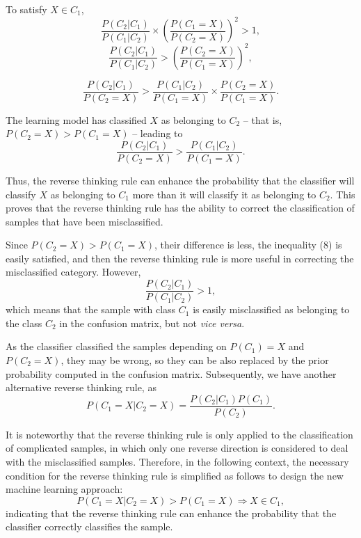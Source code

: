 To satisfy $X\in C_1$,
\begin{displaymath}
   \frac{P(C_2|C_1)}{P(C_1|C_2)}\times (\frac{P(C_1=X)}{P(C_2=X)})^2 >1,
\end{displaymath}
\begin{equation}
   \frac{P(C_2|C_1)}{P(C_1|C_2)} > (\frac{P(C_2=X)}{P(C_1=X)})^2,
\end{equation}

\begin{displaymath}
   \frac{P(C_2|C_1)}{P(C_2=X)} > \frac{P(C_1|C_2)}{P(C_1=X)}\times \frac{P(C_2=X)}{P(C_1=X)}.
\end{displaymath}

The learning model has classified $X$ as belonging to $C_2$ -- that is, $P(C_2=X)>P(C_1=X)$ -- leading to
\begin{displaymath}
   \frac{P(C_2|C_1)}{P(C_2=X)} > \frac{P(C_1|C_2)}{P(C_1=X)}.
\end{displaymath}

Thus, the reverse thinking rule can enhance the probability that the classifier will classify $X$ as belonging to $C_1$ more than it will classify it as belonging to $C_2$. This proves that the reverse thinking rule has the ability to correct the classification of samples that have been misclassified.


Since $P(C_2=X)>P(C_1=X)$, their difference is less, the inequality (8) is easily satisfied, and then the reverse thinking rule is more useful in correcting the misclassified category. However,
\begin{displaymath}
   \frac{P(C_2|C_1)}{P(C_1|C_2)} > 1,
\end{displaymath}
which means that the sample with class $C_1$ is easily misclassified as belonging to the class $C_2$ in the confusion matrix, but not \textit{vice versa}.

As the classifier classified the samples depending on $P(C_1)=X$ and $P(C_2=X)$, they may be wrong, so they can be also replaced by the prior probability computed in the confusion matrix. Subsequently, we have another alternative reverse thinking rule, as
\begin{equation}
  P(C_1=X|C_2=X)=\frac{P(C_2|C_1)P(C_1)}{P(C_2)}.
\end{equation}

It is noteworthy that the reverse thinking rule is only applied to the classification of complicated samples, in which only one reverse direction is considered to deal with the misclassified samples. Therefore, in the following context, the necessary condition for the reverse thinking rule is simplified as follows to design the new machine learning approach:
\begin{equation}
    P(C_1=X|C_2=X)>P(C_1=X)\Rightarrow X\in C_1,
\end{equation}
indicating that the reverse thinking rule can enhance the probability that the classifier correctly classifies the sample.

